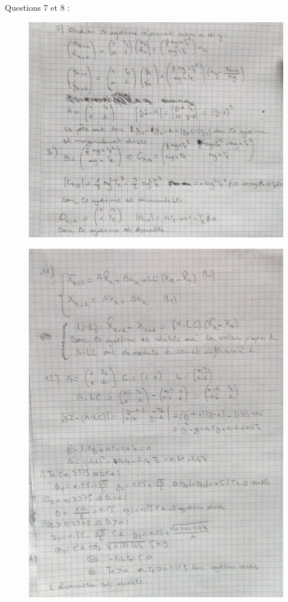\documentclass[14pt]{extarticle}
\begin{document}
\break
Questions 7 et 8 :
\newline 

\begin{figure} [tbh]
\vspace{0.1cm}
\centering
\includegraphics[width=\columnwidth]{"images/q7_q8.jpg"}
        
\end{figure}

\break 
\begin{figure} [tbh]
    \vspace{0.1cm}
        \centering
        \includegraphics[width=\columnwidth]{"images/q11_q12.jpg"}
    
    \end{figure}
\end{document}

